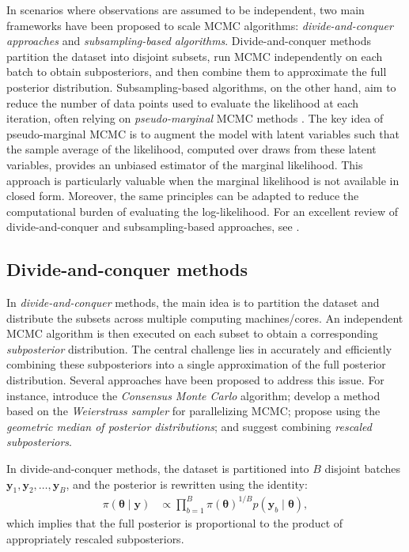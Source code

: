 In scenarios where observations are assumed to be independent, two main frameworks have been proposed to scale MCMC algorithms: \textit{divide-and-conquer approaches} and \textit{subsampling-based algorithms}. Divide-and-conquer methods partition the dataset into disjoint subsets, run MCMC independently on each batch to obtain subposteriors, and then combine them to approximate the full posterior distribution. Subsampling-based algorithms, on the other hand, aim to reduce the number of data points used to evaluate the likelihood at each iteration, often relying on \textit{pseudo-marginal} MCMC methods \cite{andrieu2009pseudoefficient}. The key idea of pseudo-marginal MCMC is to augment the model with latent variables such that the sample average of the likelihood, computed over draws from these latent variables, provides an unbiased estimator of the marginal likelihood. This approach is particularly valuable when the marginal likelihood is not available in closed form. Moreover, the same principles can be adapted to reduce the computational burden of evaluating the log-likelihood. For an excellent review of divide-and-conquer and subsampling-based approaches, see \cite{bardenet2017markov}.

\subsection{Divide-and-conquer methods}
In \textit{divide-and-conquer} methods, the main idea is to partition the dataset and distribute the subsets across multiple computing machines/cores. An independent MCMC algorithm is then executed on each subset to obtain a corresponding \textit{subposterior} distribution. The central challenge lies in accurately and efficiently combining these subposteriors into a single approximation of the full posterior distribution. Several approaches have been proposed to address this issue. For instance, \cite{huang2005sampling,scott2016bayes, rendell2020global, scott2022bayes} introduce the \textit{Consensus Monte Carlo} algorithm; \cite{wang2013parallelizing} develop a method based on the \textit{Weierstrass sampler} for parallelizing MCMC; \cite{minsker2015scalable} propose using the \textit{geometric median of posterior distributions}; and \cite{wu2017average} suggest combining \textit{rescaled subposteriors}.

In divide-and-conquer methods, the dataset is partitioned into \( B \) disjoint batches \( \mathbf{y}_1, \mathbf{y}_2, \dots, \mathbf{y}_B \), and the posterior is rewritten using the identity:
\begin{align*}
	\pi(\boldsymbol{\theta} \mid \mathbf{y}) &\propto \prod_{b=1}^B \pi(\boldsymbol{\theta})^{1/B} p(\mathbf{y}_b \mid \boldsymbol{\theta}),
\end{align*}
which implies that the full posterior is proportional to the product of appropriately rescaled subposteriors.

